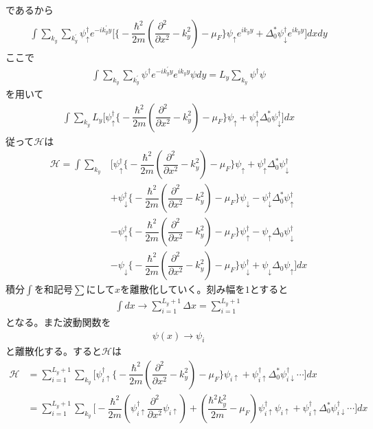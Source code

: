 \documentclass{jarticle}
\begin{document}
	であるから
	\begin{align}
	\int\displaystyle\sum_{k_y}\sum_{k_y^{'}}\psi_{\uparrow}^{\dagger}e^{-ik_y^{'}y}\Big[\big\{-\dfrac{\hbar^2}{2m}(\dfrac{\partial^{2}}{\partial x^2}-k^{2}_y)-\mu_F\big\}\psi_{\uparrow}e^{ik_yy}+\Delta^{*}_0\psi_{\downarrow}^{\dagger}e^{ik_yy}\Big]dxdy
	\end{align}
	ここで
	\begin{align}
	\int\displaystyle\sum_{k_y}\sum_{k_y^{'}}\psi^{\dagger}e^{-ik_y^{'}y}e^{ik_yy}{\psi}dy=L_y\sum_{k_y}\psi^{\dagger}\psi
	\end{align}
	を用いて
	\begin{align}
	\int\displaystyle\sum_{k_y}L_y\Big[\psi_{\uparrow}^{\dagger}\big\{-\dfrac{\hbar^2}{2m}(\dfrac{\partial^{2}}{\partial x^2}-k^{2}_y)-\mu_F\big\}\psi_{\uparrow}+\psi_{\uparrow}^{\dagger}\Delta^{*}_0\psi_{\downarrow}^{\dagger}\Big]dx
	\end{align}
	従って$\mathcal{H}$は
	\begin{align}
	\mathcal{H}=\int\displaystyle\sum_{k_y}&\Big[\psi_{\uparrow}^{\dagger}\big\{-\dfrac{\hbar^2}{2m}(\dfrac{\partial^{2}}{\partial x^2}-k^{2}_y)-\mu_F\big\}\psi_{\uparrow}+\psi_{\uparrow}^{\dagger}\Delta^{*}_0\psi_{\downarrow}^{\dagger}\\
	&+\psi_{\downarrow}^{\dagger}\big\{-\dfrac{\hbar^2}{2m}(\dfrac{\partial^{2}}{\partial x^2}-k^{2}_y)-\mu_F\big\}\psi_{\downarrow}-\psi_{\downarrow}^{\dagger}\Delta^{*}_0\psi_{\uparrow}^{\dagger}\\
	&-\psi_{\uparrow}^{\dagger}\big\{-\dfrac{\hbar^2}{2m}(\dfrac{\partial^{2}}{\partial x^2}-k^{2}_y)-\mu_F\big\}\psi_{\uparrow}^{\dagger}-\psi_{\uparrow}\Delta_0\psi_{\downarrow}^{\dagger}\\
	&-\psi_{\downarrow}\big\{-\dfrac{\hbar^2}{2m}(\dfrac{\partial^{2}}{\partial x^2}-k^{2}_y)-\mu_F\big\}\psi_{\downarrow}^{\dagger}+\psi_{\downarrow}\Delta_0\psi_{\uparrow}\Big]dx
	\end{align}
	積分$\int$を和記号$\sum$にして$x$を離散化していく。刻み幅を$1$とすると
	\begin{align}
	\int dx\rightarrow\sum_{i=1}^{L_y+1}\Delta x=\sum_{i=1}^{L_y+1}
	\end{align}
	となる。また波動関数を
	\begin{align}
	\psi(x)\rightarrow\psi_i		%
	\end{align}
	と離散化する。すると$\mathcal{H}$は
	\begin{align}
	\mathcal{H}&=\sum_{i=1}^{L_y+1}\displaystyle\sum_{k_y}\Big[\psi_{i\uparrow}^{\dagger}\big\{-\dfrac{\hbar^2}{2m}(\dfrac{\partial^{2}}{\partial x^2}-k^{2}_y)-\mu_F\big\}\psi_{i\uparrow}+\psi_{i\uparrow}^{\dagger}\Delta^{*}_0\psi_{i\downarrow}^{\dagger}\cdots\Big]dx\\
	&=\sum_{i=1}^{L_y+1}\displaystyle\sum_{k_y}\Big[-\dfrac{\hbar^2}{2m}(\psi_{i\uparrow}^{\dagger}\dfrac{\partial^{2}}{\partial x^2}\psi_{i\uparrow})+(\dfrac{\hbar^2k^{2}_y}{2m}-\mu_F)\psi_{i\uparrow}^{\dagger}\psi_{i\uparrow}+\psi_{i\uparrow}^{\dagger}\Delta^{*}_0\psi_{i\downarrow}^{\dagger}\cdots\Big]dx
	\end{align}
\end{document}
